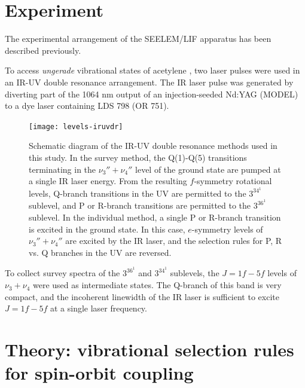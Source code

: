 \documentclass[12pt]{mitthesis}
\begin{document}
\section{Experiment}



The experimental arrangement of the SEELEM/LIF apparatus has been
described previously.


To access \emph{ungerade} vibrational states of acetylene \astate, two
laser pulses were used in an IR-UV double resonance arrangement.  The
IR laser pulse was generated by diverting part of the 1064 nm output
of an injection-seeded Nd:YAG (MODEL) to a dye laser containing LDS
798 (OR 751).



\begin{figure}
  \caption{Schematic diagram of the IR-UV double resonance methods
    used in this study.  In the survey method, the Q(1)-Q(5)
    transitions terminating in the $\nu_3''+\nu_4''$ level of the
    ground state are pumped at a single IR laser energy.  From the
    resulting $f$-symmetry rotational levels, Q-branch transitions in
    the UV are permitted to the $3^34^1$  sublevel, and P or
    R-branch transitions are permitted to the $3^36^1$ 
    sublevel.  In the individual method, a single P or R-branch
    transition is excited in the ground state.  In this case,
    $e$-symmetry levels of $\nu_3''+\nu_4''$ are excited by the IR
    laser, and the selection rules for P, R vs. Q branches in the UV
    are reversed.}
  \label{fig:levels-iruvdr}
  \centering

  \texttt{[image: levels-iruvdr]}
\end{figure}


To collect survey spectra of the $3^36^1$ and $3^34^1$ 
sublevels, the $J=1f-5f$ levels of \xstate\ $\nu_3+\nu_4$
were used as intermediate states.  The Q-branch of this band is very
compact, and the incoherent linewidth of the IR laser is sufficient to
excite $J=1f-5f$ at a single laser frequency.



\section{Theory: vibrational selection rules for spin-orbit coupling}
\end{document}

